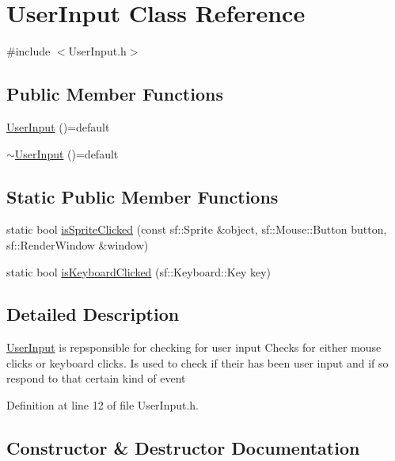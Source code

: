 \hypertarget{class_user_input}{}\section{User\+Input Class Reference}
\label{class_user_input}


{\ttfamily \#include $<$User\+Input.\+h$>$}

\subsection*{Public Member Functions}
\begin{DoxyCompactItemize}
\item 
\mbox{\hyperlink{class_user_input_ace219b17c2e355536141cda8a241e6f9}{User\+Input}} ()=default
\item 
\mbox{\hyperlink{class_user_input_aa4db2151dcad8d3a522682aaa784991b}{$\sim$\+User\+Input}} ()=default
\end{DoxyCompactItemize}
\subsection*{Static Public Member Functions}
\begin{DoxyCompactItemize}
\item 
static bool \mbox{\hyperlink{class_user_input_a38692411e807e12f638d9f29f46d944d}{is\+Sprite\+Clicked}} (const sf\+::\+Sprite \&object, sf\+::\+Mouse\+::\+Button button, sf\+::\+Render\+Window \&window)
\item 
static bool \mbox{\hyperlink{class_user_input_aa26c28cfd6d9a7d573edbc08fa123ace}{is\+Keyboard\+Clicked}} (sf\+::\+Keyboard\+::\+Key key)
\end{DoxyCompactItemize}


\subsection{Detailed Description}
\mbox{\hyperlink{class_user_input}{User\+Input}} is repsponsible for checking for user input Checks for either mouse clicks or keyboard clicks. Is used to check if their has been user input and if so respond to that certain kind of event 

Definition at line 12 of file User\+Input.\+h.



\subsection{Constructor \& Destructor Documentation}
\mbox{\label{class_user_input_ace219b17c2e355536141cda8a241e6f9}} 
